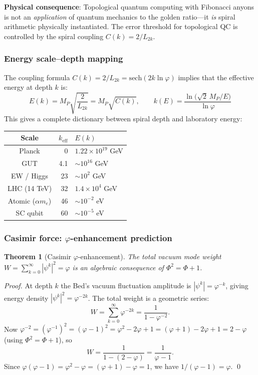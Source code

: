 \documentclass[12pt,a4paper]{article}
\newtheorem{theorem}{Theorem}[section]
\begin{document}
\textbf{Physical consequence}: Topological quantum computing with Fibonacci anyons is not an \emph{application} of quantum mechanics to the golden ratio---it \emph{is} spiral arithmetic physically instantiated.  The error threshold for topological QC is controlled by the spiral coupling $C(k) = 2/L_{2k}$.

\subsubsection{Energy scale--depth mapping}

The coupling formula $C(k) = 2/L_{2k} = \mathrm{sech}(2k\ln\varphi)$ implies that the effective energy at depth $k$ is:
\begin{equation}
\boxed{E(k) = M_P \sqrt{\frac{2}{L_{2k}}} = M_P \sqrt{C(k)}, \qquad k(E) = \frac{\ln\!\bigl(\sqrt{2}\,M_P/E\bigr)}{\ln\varphi}}
\end{equation}
This gives a complete dictionary between spiral depth and laboratory energy:
\begin{center}
\small
\begin{tabular}{|c|r|l|}
\hline
\textbf{Scale} & \textbf{$k_{\mathrm{eff}}$} & \textbf{$E(k)$} \\
\hline
Planck & 0 & $1.22 \times 10^{19}$ GeV \\
GUT & 4.1 & $\sim 10^{16}$ GeV \\
EW / Higgs & 23 & $\sim 10^{2}$ GeV \\
LHC (14 TeV) & 32 & $1.4 \times 10^{4}$ GeV \\
Atomic ($\alpha m_e$) & 46 & $\sim 10^{-2}$ eV \\
SC qubit & 60 & $\sim 10^{-5}$ eV \\
\hline
\end{tabular}
\end{center}

\subsubsection{Casimir force: $\varphi$-enhancement prediction}

\begin{theorem}[Casimir $\varphi$-enhancement]
The total vacuum mode weight $W = \sum_{k=0}^{\infty}|\psi^k|^2 = \varphi$ is an algebraic consequence of $\Phi^2 = \Phi + 1$.
\end{theorem}

\begin{proof}
At depth $k$ the Bed's vacuum fluctuation amplitude is $|\psi^k| = \varphi^{-k}$, giving energy density $|\psi^k|^2 = \varphi^{-2k}$.  The total weight is a geometric series:
\[
W = \sum_{k=0}^{\infty} \varphi^{-2k} = \frac{1}{1 - \varphi^{-2}}.
\]
Now $\varphi^{-2} = (\varphi^{-1})^2 = (\varphi - 1)^2 = \varphi^2 - 2\varphi + 1 = (\varphi+1) - 2\varphi + 1 = 2 - \varphi$ (using $\Phi^2 = \Phi + 1$), so
\[
W = \frac{1}{1 - (2 - \varphi)} = \frac{1}{\varphi - 1}.
\]
Since $\varphi(\varphi - 1) = \varphi^2 - \varphi = (\varphi + 1) - \varphi = 1$, we have $1/(\varphi - 1) = \varphi$.  \qed
\end{proof}
\end{document}
